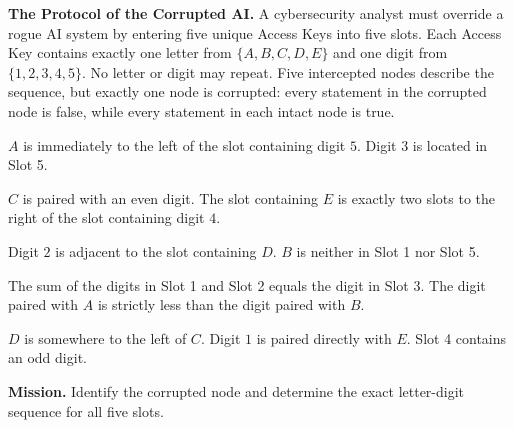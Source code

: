 \documentclass{llmxive}
\begin{document}
\begin{caseprompt}
\textbf{The Protocol of the Corrupted AI.}
A cybersecurity analyst must override a rogue AI system by entering five unique Access Keys into five slots. Each Access Key contains exactly one letter from \(\{A,B,C,D,E\}\) and one digit from \(\{1,2,3,4,5\}\). No letter or digit may repeat. Five intercepted nodes describe the sequence, but exactly one node is corrupted: every statement in the corrupted node is false, while every statement in each intact node is true.

\begin{description}[leftmargin=1.8em,itemsep=0.2em,topsep=0.3em]
  \item[Node 1.] \(A\) is immediately to the left of the slot containing digit \(5\). Digit \(3\) is located in Slot 5.
  \item[Node 2.] \(C\) is paired with an even digit. The slot containing \(E\) is exactly two slots to the right of the slot containing digit \(4\).
  \item[Node 3.] Digit \(2\) is adjacent to the slot containing \(D\). \(B\) is neither in Slot 1 nor Slot 5.
  \item[Node 4.] The sum of the digits in Slot 1 and Slot 2 equals the digit in Slot 3. The digit paired with \(A\) is strictly less than the digit paired with \(B\).
  \item[Node 5.] \(D\) is somewhere to the left of \(C\). Digit \(1\) is paired directly with \(E\). Slot 4 contains an odd digit.
\end{description}

\textbf{Mission.} Identify the corrupted node and determine the exact letter-digit sequence for all five slots.
\end{caseprompt}
\end{document}
